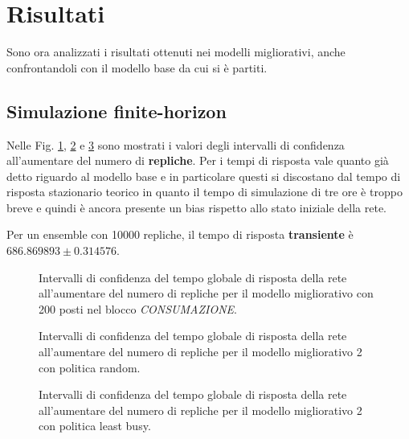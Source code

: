 \documentclass{article}
\begin{document}
\section{Risultati}

Sono ora analizzati i risultati ottenuti nei modelli migliorativi, anche confrontandoli con il modello base da cui si è partiti.

\subsection{Simulazione finite-horizon}

Nelle Fig. \ref{fig:grt_finite_200_replicas}, \ref{fig:ext_grt_finite_m21_replicas} e \ref{fig:ext_grt_finite_m22_replicas} sono mostrati i valori degli intervalli di confidenza all'aumentare del numero di \textbf{repliche}. 
Per i tempi di risposta vale quanto già detto riguardo al modello base e in particolare questi si discostano dal tempo di risposta stazionario teorico in quanto il tempo di simulazione di tre ore è troppo breve e quindi è ancora presente un bias rispetto allo stato iniziale della rete.  

Per un ensemble con 10000 repliche, il tempo di risposta \textbf{transiente} è \(686.869893 \pm 0.314576\).
\begin{figure}[H]
  \centering
  
  \caption{Intervalli di confidenza del tempo globale di risposta della rete all'aumentare del numero di repliche per il modello migliorativo con 200 posti nel blocco \textit{CONSUMAZIONE}.}
  \label{fig:grt_finite_200_replicas}
\end{figure}

\begin{figure}[H]
  \centering
  
  \caption{Intervalli di confidenza del tempo globale di risposta della rete all'aumentare del numero di repliche per il modello migliorativo 2 con politica random.}
  \label{fig:ext_grt_finite_m21_replicas}
\end{figure}

\begin{figure}[H]
  \centering
  
  \caption{Intervalli di confidenza del tempo globale di risposta della rete all'aumentare del numero di repliche per il modello migliorativo 2 con politica least busy.}
  \label{fig:ext_grt_finite_m22_replicas}
\end{figure}
\end{document}
